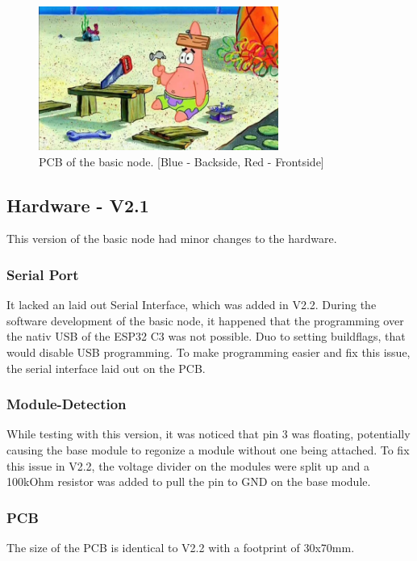     \begin{figure}[H]
        \centering
        \includegraphics[width=0.7\textwidth]{assets/HW/TBD.png}
        \caption{PCB of the basic node. [Blue - Backside, Red - Frontside]}
    \end{figure}	


\subsection{Hardware - V2.1}

    This version of the basic node had minor changes to the hardware. 

    \subsubsection{Serial Port}

        It lacked an laid out Serial Interface, which was added in V2.2.
        During the software development of the basic node, it happened that the 
        programming over the nativ USB of the ESP32 C3 was not possible. Duo to 
        setting buildflags, that would disable USB programming. To make programming
        easier and fix this issue, the serial interface laid out on the PCB. 


    \subsubsection{Module-Detection}
        While testing with this version, it was noticed that pin 3 was floating,
        potentially causing the base module to regonize a module without one being attached.
        To fix this issue in V2.2, the voltage divider on the modules were split up and
        a 100kOhm resistor was added to pull the pin to GND on the base module.

    \subsubsection{PCB}
        The size of the PCB is identical to V2.2 with a footprint of 30x70mm. 

